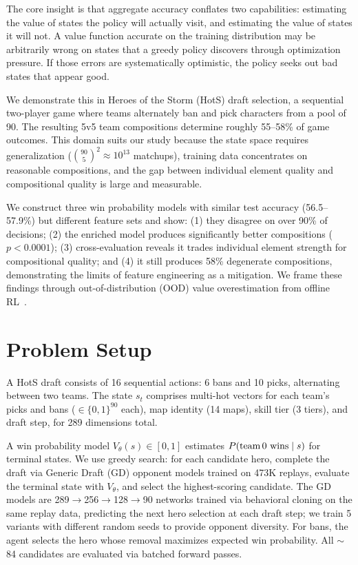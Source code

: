 \documentclass[conference]{IEEEtran}
\begin{document}
The core insight is that aggregate accuracy conflates two capabilities: estimating the value of states the policy will actually visit, and estimating the value of states it will not. A value function accurate on the training distribution may be arbitrarily wrong on states that a greedy policy discovers through optimization pressure. If those errors are systematically optimistic, the policy seeks out bad states that appear good.

We demonstrate this in Heroes of the Storm (HotS) draft selection, a sequential two-player game where teams alternately ban and pick characters from a pool of 90. The resulting 5v5 team compositions determine roughly 55--58\% of game outcomes. This domain suits our study because the state space requires generalization ($\binom{90}{5}^2 \!\approx\! 10^{13}$ matchups), training data concentrates on reasonable compositions, and the gap between individual element quality and compositional quality is large and measurable.

We construct three win probability models with similar test accuracy (56.5--57.9\%) but different feature sets and show: (1) they disagree on over 90\% of decisions; (2) the enriched model produces significantly better compositions ($p\!<\!0.0001$); (3) cross-evaluation reveals it trades individual element strength for compositional quality; and (4) it still produces 58\% degenerate compositions, demonstrating the limits of feature engineering as a mitigation. We frame these findings through out-of-distribution (OOD) value overestimation from offline RL~\cite{kumar2020conservative,levine2020offline}.

\section{Problem Setup}

A HotS draft consists of 16 sequential actions: 6 bans and 10 picks, alternating between two teams. The state $s_t$ comprises multi-hot vectors for each team's picks and bans ($\in \{0,1\}^{90}$ each), map identity (14 maps), skill tier (3 tiers), and draft step, for 289 dimensions total.

A win probability model $V_\theta(s) \in [0,1]$ estimates $P(\text{team\,0 wins} \mid s)$ for terminal states. We use greedy search: for each candidate hero, complete the draft via Generic Draft (GD) opponent models trained on 473K replays, evaluate the terminal state with $V_\theta$, and select the highest-scoring candidate. The GD models are 289$\to$256$\to$128$\to$90 networks trained via behavioral cloning on the same replay data, predicting the next hero selection at each draft step; we train 5 variants with different random seeds to provide opponent diversity. For bans, the agent selects the hero whose removal maximizes expected win probability. All $\sim$84 candidates are evaluated via batched forward passes.
\end{document}

